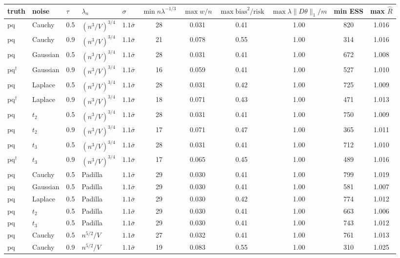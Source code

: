 \begin{longtable}{lllllcccccc}
\toprule
truth & noise & $\tau$ & $\lambda_n$ & $\sigma$ & $\min n\lambda^{-1/3}$ & $\max w/n$ & $\max \text{bias}^2/\text{risk}$ & $\max \lambda\|D\theta\|_1/m$ & min ESS & max $\hat R$ \\
\midrule
\endhead
pq & Cauchy & 0.5 & $(n^3/V)^{3/4}$ & $1.1\bar\sigma$ & 28 & 0.031 & 0.41 & 1.00 & 820 & 1.016 \\
pq & Cauchy & 0.9 & $(n^3/V)^{3/4}$ & $1.1\bar\sigma$ & 21 & 0.078 & 0.55 & 1.00 & 314 & 1.016 \\
pq & Gaussian & 0.5 & $(n^3/V)^{3/4}$ & $1.1\bar\sigma$ & 28 & 0.031 & 0.41 & 1.00 & 672 & 1.008 \\
pq$^\dagger$ & Gaussian & 0.9 & $(n^3/V)^{3/4}$ & $1.1\bar\sigma$ & 16 & 0.059 & 0.41 & 1.00 & 527 & 1.010 \\
pq & Laplace & 0.5 & $(n^3/V)^{3/4}$ & $1.1\bar\sigma$ & 28 & 0.031 & 0.42 & 1.00 & 725 & 1.009 \\
pq$^\dagger$ & Laplace & 0.9 & $(n^3/V)^{3/4}$ & $1.1\bar\sigma$ & 18 & 0.071 & 0.43 & 1.00 & 471 & 1.013 \\
pq & $t_2$ & 0.5 & $(n^3/V)^{3/4}$ & $1.1\bar\sigma$ & 28 & 0.031 & 0.41 & 1.00 & 750 & 1.009 \\
pq & $t_2$ & 0.9 & $(n^3/V)^{3/4}$ & $1.1\bar\sigma$ & 17 & 0.071 & 0.47 & 1.00 & 365 & 1.011 \\
pq & $t_3$ & 0.5 & $(n^3/V)^{3/4}$ & $1.1\bar\sigma$ & 28 & 0.031 & 0.41 & 1.00 & 712 & 1.010 \\
pq$^\dagger$ & $t_3$ & 0.9 & $(n^3/V)^{3/4}$ & $1.1\bar\sigma$ & 17 & 0.065 & 0.45 & 1.00 & 489 & 1.016 \\
pq & Cauchy & 0.5 & Padilla & $1.1\bar\sigma$ & 29 & 0.030 & 0.41 & 1.00 & 799 & 1.019 \\
pq & Gaussian & 0.5 & Padilla & $1.1\bar\sigma$ & 29 & 0.030 & 0.41 & 1.00 & 581 & 1.007 \\
pq & Laplace & 0.5 & Padilla & $1.1\bar\sigma$ & 29 & 0.030 & 0.42 & 1.00 & 774 & 1.012 \\
pq & $t_2$ & 0.5 & Padilla & $1.1\bar\sigma$ & 29 & 0.030 & 0.41 & 1.00 & 663 & 1.006 \\
pq & $t_3$ & 0.5 & Padilla & $1.1\bar\sigma$ & 29 & 0.030 & 0.41 & 1.00 & 743 & 1.012 \\
pq & Cauchy & 0.5 & $n^{5/2}/V$ & $1.1\bar\sigma$ & 27 & 0.032 & 0.41 & 1.00 & 761 & 1.013 \\
pq & Cauchy & 0.9 & $n^{5/2}/V$ & $1.1\bar\sigma$ & 19 & 0.083 & 0.55 & 1.00 & 310 & 1.025 \\

\end{longtable}
